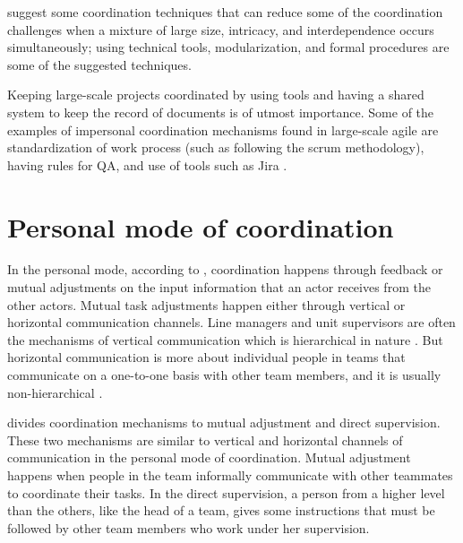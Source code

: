 \citet{Kraut1995a} suggest some coordination techniques that can reduce some of the coordination challenges when a mixture of large size, intricacy, and interdependence occurs simultaneously;  using technical tools, modularization, and formal procedures are some of the suggested techniques.

Keeping large-scale projects coordinated by using tools and having a shared system to keep the record of documents is of utmost importance. Some of the examples of impersonal coordination mechanisms found in large-scale agile are standardization of work process (such as following the scrum methodology), having rules for QA, and use of tools such as Jira \citep{Nyrud2017b}.

\section{Personal mode of coordination}

In the personal mode, according to \citet{VanDeVen1976}, coordination happens through feedback or mutual adjustments on the input information that an actor receives from the other actors. Mutual task adjustments happen either through vertical or horizontal communication channels.
Line managers and unit supervisors are often the mechanisms of vertical communication which is hierarchical in nature \citep{Thompson2014}. But horizontal communication is more about individual people in teams that communicate on a one-to-one basis with other team members, and it is usually non-hierarchical \citep{VanDeVen1976}.

\citet{Mintzberg1980} divides coordination mechanisms to mutual adjustment and direct supervision. These two mechanisms are similar to vertical and horizontal channels of communication in the personal mode of coordination. Mutual adjustment happens when people in the team informally communicate with other teammates to coordinate their tasks. In the direct supervision, a person from a higher level than the others, like the head of a team, gives some instructions that must be followed by other team members who work under her supervision.



